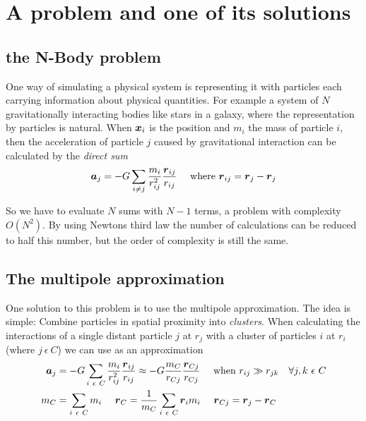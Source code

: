 
\section{A problem and one of its solutions}

\subsection{the N-Body problem}
One way of simulating a physical system is representing it with particles each carrying information about physical quantities. For example a system of $N$ gravitationally interacting bodies like stars in a galaxy, where the representation by particles is natural. When $\boldsymbol{x}_{i}$ is the position and $m_i$ the mass of particle $i$, then the acceleration of particle $j$ caused by gravitational interaction can be calculated by the \emph{direct sum}
\begin{equation}
\boldsymbol{a}_j = - G \sum_{i \ne j} \frac{m_i}{r_{ij}^2} \frac{\boldsymbol{r}_{ij}}{r_{ij}} ~~~~ \text{where}~\boldsymbol{r}_{ij} = \boldsymbol{r}_j - \boldsymbol{r}_j
\end{equation}

So we have to evaluate $N$ sums with $N-1$ terms, a problem with complexity $O(N^2)$. By using Newtons third law the number of calculations can be reduced to half this number, but the order of complexity is still the same.\\


\subsection{The multipole approximation}
One solution to this problem is to use the multipole approximation. The idea is simple: Combine particles in spatial proximity into \emph{clusters}. When calculating the interactions of a single distant particle $j$ at $r_j$ with a cluster of particles $i$ at $r_i$  (where $j~\epsilon~C$) we can use as an approximation
\begin{align}
\boldsymbol{a}_j &= - G \sum_{i~\epsilon~C} \frac{m_i}{r_{ij}^2} \frac{\boldsymbol{r}_{ij}}{r_{ij}} \approx - G \frac{m_{C}}{r_{Cj}} \frac{\boldsymbol{r}_{Cj}}{r_{Cj}} ~~~~ \text{when}~r_{ij} \gg r_{jk} ~~~ \forall j,k ~ \epsilon~C \\
m_C &= \sum_{i~\epsilon~C} m_i ~~~~ \boldsymbol{r}_C = \frac{1}{m_C} \sum_{i~\epsilon~C} \boldsymbol{r}_i m_i ~~~~ \boldsymbol{r}_{Cj} = \boldsymbol{r}_j - \boldsymbol{r}_C 
\end{align}

